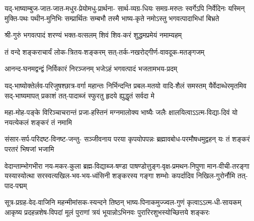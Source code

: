 \fourlineindentedshloka
{यद्-भाष्याम्बुज-जात-जात-मधुर-प्रेयोमधु-प्रार्थना-}
{सार्थ-व्यग्र-धियः समग्र-मरुतः स्वर्गेऽपि निर्वेदिनः}
{यस्मिन् मुक्ति-पथः पथीन-मुनिभिः सम्प्रार्थितः सम्बभौ}
{तस्मै भाष्य-कृते नमोऽस्तु भगवत्पादाभिधां बिभ्रते}


\twolineshloka
{श्री-गुरुं भगवत्पादं शरण्यं भक्त-वत्सलम्}
{शिवं शिव-करं शुद्धमप्रमेयं नमाम्यहम्}


\twolineshloka
{तं वन्दे शङ्कराचार्यं लोक-त्रितय-शङ्करम्}
{सत्-तर्क-नखरोद्गीर्ण-वावदूक-मतङ्गजम्}


\twolineshloka
{आनन्द-घनमद्वन्द्वं निर्विकारं निरञ्जनम्}
{भजेऽहं भगवत्पादं भजतामभय-प्रदम्}


\fourlineindentedshloka
{यद्-भाष्योक्तेर्लव-परिजुषश्छात्र-वर्गा महान्तः}
{निर्भिन्दन्ति प्रबल-मतयो वादि-शैलं समस्तम्}
{यैर्वेदाब्धेरमृतमिव सद्-भाष्यमापत् प्रकाशं}
{तत्-पादाब्जं स्फुरतु हृदये ह्युद्धृतं सर्वदा मे}


\fourlineindentedshloka
{महा-मोह-पङ्के विरिञ्चाचरान्तं}
{प्रजा-हस्तिनं मग्नमालोक्य भाष्यैः}
{जलैः क्षालयित्वाऽऽत्म-विद्या-दिवं यो}
{नयत्येकलं शङ्करं तं नमामि}


\fourlineindentedshloka
{संसार-सर्प-परिदष्ट-विनष्ट-जन्तु-}
{सञ्जीवनाय परया कृपयोपपन्नः}
{ब्रह्मावबोध-परमौषधमुद्वहन् यः}
{तं शङ्करं परतरं भिषजां भजामि}


\fourlineindentedshloka
{वेदान्ताम्भोगभीरा नय-मकर-कुला ब्रह्म-विद्याब्ज-षण्डा}
{पाषण्डोत्तुङ्ग-वृक्ष-प्रमथन-निपुणा मान-वीची-तरङ्गा}
{यस्यास्योत्था सरस्वत्यखिल-भव-भय-ध्वंसिनी शङ्करस्य}
{गङ्गा शम्भोः कपर्दादिव निखिल-गुरोर्नौमि तत्-पाद-पद्मम्}


\fourlineindentedshloka
{सूत्र-प्रग्रह-वेद-वाजिनि महन्मीमांसक-स्यन्दने}
{तिष्ठन् भाष्य-पिनाकमुज्ज्वल-गुणं कृत्वाऽऽत्म-धी-सायकम्}
{आकृष्य प्रदहन्नशेष-विपदां मूलं पुराणां त्रयं}
{भूयान्नोऽभिनवः पुरारिरशुभस्योच्छित्तये शङ्करः}

